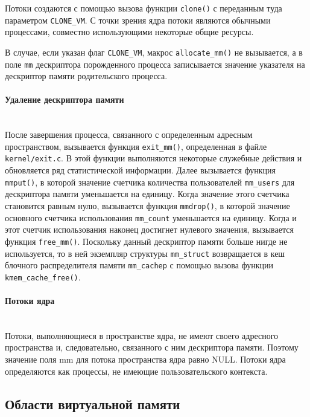 \documentclass[12pt]{article}
\begin{document}
Потоки создаются с помощью вызова функции \verb!clone()! с переданным туда параметром \verb!CLONE_VM!.
С точки зрения ядра потоки являются обычными процессами, совместно использующими некоторые общие ресурсы.

В случае, если указан флаг \verb!CLONE_VM!, макрос \verb!allocate_mm()! не вызывается, а в поле \verb!mm! дескриптора порожденного процесса записывается значение указателя на дескриптор памяти родительского процесса.

\paragraph*{Удаление дескриптора памяти}
~\\

После завершения процесса, связанного с определенным адресным пространством, вызывается функция \verb!exit_mm()!, определенная в файле \verb!kernel/exit.c!.
В этой функции выполняются некоторые служебные действия и обновляется ряд статистической информации. Далее вызывается функция \verb!mmput()!, 
в которой значение счетчика количества пользователей \verb!mm_users! для дескриптора памяти уменьшается на единицу. Когда значение этого счетчика становится равным нулю, вызывается функция \verb!mmdrop()!, 
в которой значение основного счетчика использования \verb!mm_count! уменьшается на единицу.
Когда и этот счетчик использования наконец достигнет нулевого значения, вызывается функция \verb!free_mm()!. Поскольку данный дескриптор памяти больше нигде не используется, 
то в ней экземпляр структуры \verb!mm_struct! возвращается в кеш блочного распределителя памяти \verb!mm_cachep! с помощью вызова функции \verb!kmem_cache_free()!.

\paragraph*{Потоки ядра}
~\\

Потоки, выполняющиеся в пространстве ядра, не имеют своего адресного пространства и, 
следовательно, связанного с ним дескриптора памяти. Поэтому значение поля mm для потока пространства ядра равно NULL. 
Потоки ядра определяются как процессы, не имеющие пользовательского контекста.

\pagebreak
\subsection*{Области виртуальной памяти}
\end{document}
